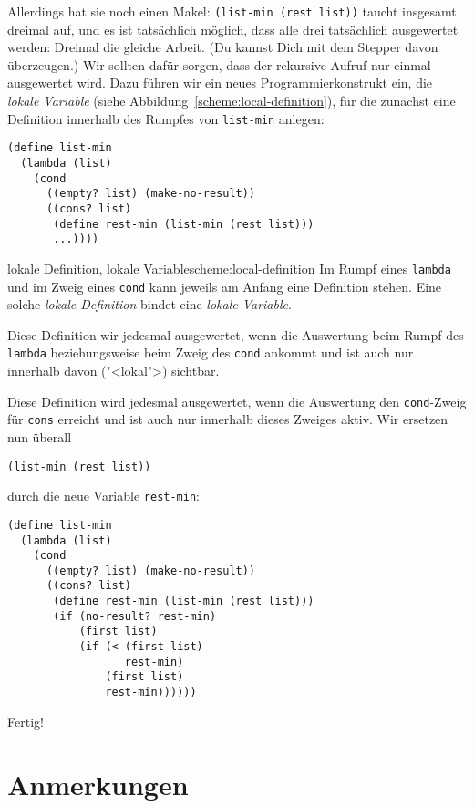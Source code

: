 Allerdings hat sie noch einen Makel: \lstinline{(list-min (rest list))}
taucht insgesamt dreimal auf, und es ist tatsächlich
möglich, dass alle drei tatsächlich ausgewertet werden: Dreimal die
gleiche Arbeit.  (Du kannst Dich mit dem Stepper davon überzeugen.)
Wir sollten dafür sorgen, dass der rekursive Aufruf nur einmal
ausgewertet wird.  Dazu führen wir ein neues Programmierkonstrukt ein,
die \textit{lokale Variable} (siehe Abbildung~\ref{scheme:local-definition}), für die zunächst
eine Definition innerhalb des Rumpfes von \lstinline{list-min} anlegen:
%
\begin{lstlisting}
(define list-min
  (lambda (list)
    (cond
      ((empty? list) (make-no-result))
      ((cons? list)
       (define rest-min (list-min (rest list)))
       ...))))
\end{lstlisting}
%
\begin{feature}{lokale Definition, lokale Variable}{scheme:local-definition}
  Im Rumpf eines \lstinline{lambda} und im Zweig eines
  \lstinline{cond} kann jeweils am Anfang eine Definition stehen.
  Eine solche \textit{lokale Definition}
  bindet eine \textit{lokale Variable}.

  Diese Definition wir jedesmal ausgewertet, wenn die Auswertung beim
  Rumpf des \lstinline{lambda} beziehungsweise beim Zweig des
  \lstinline{cond} ankommt und ist auch nur innerhalb davon
  ("<lokal">) sichtbar.
\end{feature}
%
Diese Definition wird jedesmal ausgewertet, wenn die Auswertung den
\lstinline{cond}-Zweig für \lstinline{cons} erreicht und ist auch nur
innerhalb dieses Zweiges aktiv.  Wir ersetzen nun überall
%
\begin{lstlisting}
(list-min (rest list))
\end{lstlisting}
durch die neue Variable
\lstinline{rest-min}:
%
\begin{lstlisting}
(define list-min
  (lambda (list)
    (cond
      ((empty? list) (make-no-result))
      ((cons? list)
       (define rest-min (list-min (rest list)))
       (if (no-result? rest-min)
           (first list)
           (if (< (first list)
                  rest-min)
               (first list)
               rest-min))))))
\end{lstlisting}
%
Fertig!

\section*{Anmerkungen}

